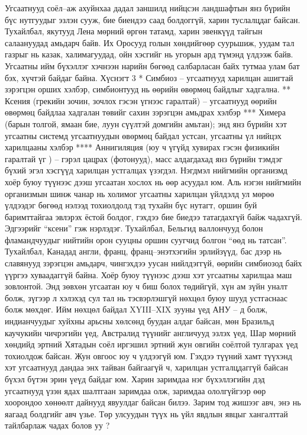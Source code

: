 Угсаатнууд соёл–аж ахуйнхаа дадал заншилд нийцсэн ландшафтын янз бүрийн бүс нутгуудыг эзлэн сууж, бие биендээ саад болдоггүй, харин туслалцдаг байсан. Тухайлбал, якутууд Лена мөрний өргөн татамд, харин эвенкүүд тайгын салаануудад амьдарч байв. Их Оросууд голын хөндийгөөр суурьшиж, уудам тал газрыг нь казак, халимагуудад, ойн хэсгийг нь угорын ард түмэнд үлдээж байв. Угсаатны ийм бүхэллэг хэчнээн нарийн бөгөөд салбарласан байх тутмаа улам бат бэх, хүчтэй байдаг байна.
Хүснэгт 3
* Симбиоз – угсаатнууд харилцан ашигтай зэрэгцэн орших хэлбэр, симбионтууд нь өөрийн өвөрмөц байдлыг хадгална.
** Ксения (грекийн зочин, зочлох гэсэн үгнээс гаралтай) – угсаатнууд өөрийн өвөрмөц байдлаа хадгалан төвийг сахин зэрэгцэн амьдрах хэлбэр
*** Химера (барын толгой, ямаан бие, луун сүүлтэй домгийн амьтан); энд янз бүрийн хэт угсаатны системд угсаатнуудын өвөрмөц байдал устсан, угсаатны үл нийцэх харилцааны хэлбэр
**** Аннигиляция (юу ч үгүйд хувирах гэсэн физикийн гаралтай үг ) – гэрэл цацрах (фотонууд), масс алдагдахад янз бүрийн тэмдэг бүхий эгэл хэсгүүд харилцан устгалцах үзэгдэл.
Нэгдмэл нийгмийн организмд хоёр буюу түүнээс дээш угсаатан хослох нь өөр асуудал юм. Аль нэгэн нийгмийн организмын шинж чанар нь холимог угсаатны харилцан үйлдэлд ул мөрөө үлдээдэг бөгөөд нэлээд тохиолдолд тэд тухайн бүс нутагт, оршин буй баримттайгаа эвлэрэх ёстой болдог, гэхдээ бие биедээ татагдахгүй байж чадахгүй. Эдгээрийг “ксени” гэж нэрлэдэг. Тухайлбал, Бельгид валлончууд болон фламандчуудыг нийтийн орон сууцны оршин суугчид болгон “өөд нь татсан”. Тухайлбал, Канадад англи, франц, франц–энэтхэгийн эрлийзүүд, бас дээр нь славянууд зэрэгцэн амьдарч, чингэхдээ уусан нийлдэггүй, өөрийн симбиозод байх үүргээ хуваадаггүй байна.
Хоёр буюу түүнээс дээш хэт угсаатны харилцаа маш зовлонтой. Энд зөвхөн угсаатан юу ч биш болох төдийгүй, хүн ам зүйн уналт болж, зүгээр л хэлэхэд сул тал нь тэсвэрлэшгүй нөхцөл буюу шууд устгаснаас болж мөхдөг. Ийм нөхцөл байдал XYIII–XIX зууны үед АНУ – д болж, индианчуудыг хуйхны арьсны хөлсөнд буудан алдаг байсан, мөн Бразильд каучукийн чичрэгийн үед, Австралид түүнийг англичууд эзлэх үед, Шар мөрний хөндийд эртний Хятадын соёл иргэшил эртний жун овгийн соёлтой тулгарах үед тохиолдож байсан. Жун овгоос юу ч үлдээгүй юм.
Гэхдээ түүний хамт түүхэнд хэт угсаатнууд дандаа энх тайван байгаагүй ч, харилцан устгалцдаггүй байсан бүхэл бүтэн эрин үеүд байдаг юм. Харин заримдаа нэг бүхэллэгийн дэд угсаатнууд үзэн ядах шалтгаан заримдаа олж, заримдаа ололгүйгээр өөр хоорондоо хөнөөлт дайнууд явуулдаг байсан билээ. Зарим тод жишээг авч, энэ нь яагаад болдгийг авч үзье. Төр улсуудын түүх нь үйл явдлын явцыг хангалттай тайлбарлаж чадах болов уу ?

